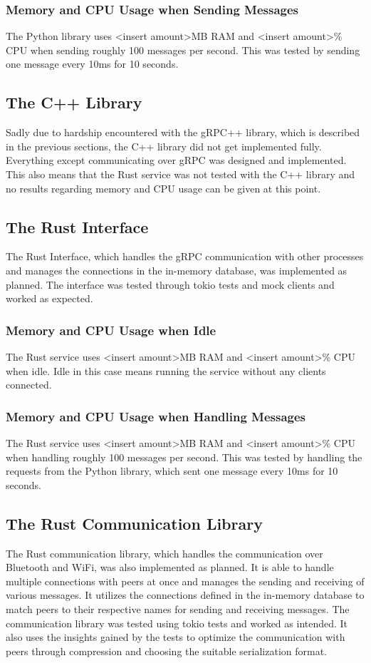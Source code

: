 \subsubsection{Memory and CPU Usage when Sending Messages}
The Python library uses <insert amount>MB RAM and <insert amount>\% CPU when sending roughly 100 messages per second. This was tested by sending one message every 10ms for 10 seconds.

\subsection{The C++ Library}
Sadly due to hardship encountered with the gRPC++ library, which is described in the previous sections, the C++ library did not get implemented fully. Everything except communicating over gRPC was designed and implemented.
This also means that the Rust service was not tested with the C++ library and no results regarding memory and CPU usage can be given at this point.

\subsection{The Rust Interface}
The Rust Interface, which handles the gRPC communication with other processes and manages the connections in the in-memory database, was implemented as planned. The interface was tested through tokio tests and mock clients and worked as expected.

\subsubsection{Memory and CPU Usage when Idle}
The Rust service uses <insert amount>MB RAM and <insert amount>\% CPU when idle. Idle in this case means running the service without any clients connected.

\subsubsection{Memory and CPU Usage when Handling Messages}
The Rust service uses <insert amount>MB RAM and <insert amount>\% CPU when handling roughly 100 messages per second. This was tested by handling the requests from the Python library, which sent one message every 10ms for 10 seconds.

\subsection{The Rust Communication Library}
The Rust communication library, which handles the communication over Bluetooth and WiFi, was also implemented as planned. It is able to handle multiple connections with peers at once and manages the sending and receiving of various messages.
It utilizes the connections defined in the in-memory database to match peers to their respective names for sending and receiving messages. The communication library was tested using tokio tests and worked as intended. It also uses the 
insights gained by the tests to optimize the communication with peers through compression and choosing the suitable serialization format.

